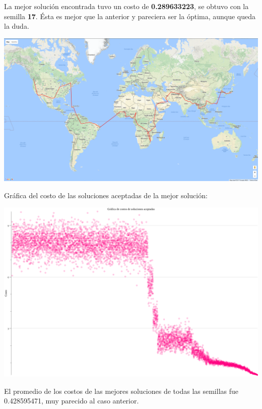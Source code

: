 \documentclass[12pt]{article}
\begin{document}
La mejor solución encontrada tuvo un costo de \textbf{0.289633223}, se obtuvo con la semilla \textbf{17}. Ésta es mejor que la anterior y pareciera ser la óptima, aunque queda la duda. \\

\begin{center}
  \includegraphics[scale=0.2]{../archivos/mapas/mapa3.png} \\
\end{center}

Gráfica del costo de las soluciones aceptadas de la mejor solución: \\

\begin{center}
\includegraphics[scale=0.3]{../archivos/graficas/soluciones-aceptadas/costos3.png} \\
\end{center}

El promedio de los costos de las mejores soluciones de todas las semillas fue 0.428595471, muy parecido al caso anterior. \\
\end{document}
